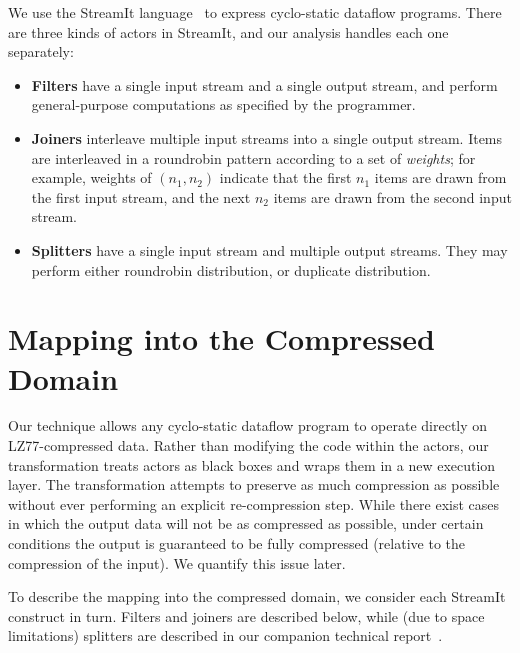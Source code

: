 We use the StreamIt language~\cite{streamitcc} to express cyclo-static
dataflow programs.  There are three kinds of actors in StreamIt, and
our analysis handles each one separately:
\begin{itemize}

\item \vspace{-2mm} {\bf Filters} have a single input stream and a
  single output stream, and perform general-purpose computations as
  specified by the programmer.

\item \vspace{-2mm} {\bf Joiners} interleave multiple input streams into a single
  output stream.  Items are interleaved in a roundrobin pattern
  according to a set of {\it weights}; for example, weights of $(n_1,
  n_2)$ indicate that the first $n_1$ items are drawn from the first
  input stream, and the next $n_2$ items are drawn from the second
  input stream.

\item \vspace{-2mm} {\bf Splitters} have a single input stream and multiple output
  streams.  They may perform either roundrobin distribution, or
  duplicate distribution. \vspace{-2mm}

\end{itemize}

\section{Mapping into the Compressed Domain}

Our technique allows any cyclo-static dataflow program to operate
directly on LZ77-compressed data.  Rather than modifying the code
within the actors, our transformation treats actors as black boxes and
wraps them in a new execution layer.  The transformation attempts to
preserve as much compression as possible without ever performing an
explicit re-compression step.  While there exist cases in which the
output data will not be as compressed as possible, under certain
conditions the output is guaranteed to be fully compressed (relative
to the compression of the input).  We quantify this issue later.

To describe the mapping into the compressed domain, we consider each
StreamIt construct in turn.  Filters and joiners are described below,
while (due to space limitations) splitters are described in our
companion technical report~\cite{techreport}.

